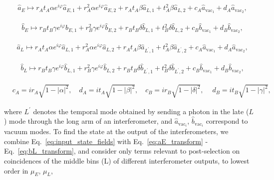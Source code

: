 \documentclass[11pt]{caltech_thesis} %
\begin{document}
\hypertarget{eq:aE_transform}{}{
\begin{align}
    &\hat{a}_{E} \mapsto r_At_A \alpha e^{i\varphi} \hat{a}_{E,1} + r_A^2 \alpha e^{i\varphi}\hat{a}_{E,2} + r_At_A\beta \hat{a}_{L,1} + t_A^2\beta \hat{a}_{L,2}+c_A\hat{a}_{\text{vac}_1}+d_A\hat{a}_{\text{vac}_2},\label{eq:aE_transform} 
\end{align}
}

\hypertarget{eq:bE_transform}{}{
\begin{align}
    &\hat{b}_{E}  \mapsto r_Bt_B \gamma e^{i\varphi} \hat{b}_{E,1} + r_B^2 \gamma e^{i\varphi}\hat{b}_{E,2} + r_Bt_B\delta \hat{b}_{L,1} + t_B^2\delta \hat{b}_{L,2}+c_B\hat{b}_{\text{vac}_1}+d_B\hat{b}_{\text{vac}_2},\label{eq:bE_transform}
\end{align}
}

\hypertarget{eq:aL_transform}{}{
\begin{align}
    &\hat{a}_{L} \mapsto  r_A t_A \alpha e^{i\varphi} \hat{a}_{L,1}  + r_A^2 \alpha e^{i\varphi}\hat{a}_{L,2} + r_A t_A\beta \hat{a}_{L^\prime,1}+ t_A^2\beta \hat{a}_{L^\prime,2}+c_A\hat{a}_{\text{vac}_1}+d_A\hat{a}_{\text{vac}_2},\label{eq:aL_transform}
\end{align}
}

\hypertarget{eq:bL_transform}{}{
\begin{align}
    &\hat{b}_{L}  \mapsto r_B t_B \gamma e^{i\varphi} \hat{b}_{L,1} + r_B^2 \gamma e^{i\varphi}\hat{b}_{L,2}  + r_B t_B\delta \hat{b}_{L^\prime,1}+ t_B^2\delta \hat{b}_{L^\prime,2}+c_B\hat{b}_{\text{vac}_1}+d_B\hat{b}_{\text{vac}_2},\label{eq:bL_transform}
\end{align}
}

\begin{align}
    &c_A =ir_A\sqrt{1-|\alpha|^2}, \quad d_A=it_A\sqrt{1-|\beta|^2},\quad
    c_B =ir_B\sqrt{1-|\delta|^2},\quad\ d_B = it_B\sqrt{1-|\gamma|^2},\nonumber
\end{align}

where $L^\prime$ denotes the temporal mode obtained by sending a photon in the late ($L$) mode through the long arm of an interferometer, and $\hat{a}_{\text{vac}_i}$, $\hat{b}_{\text{vac}_i}$ correspond to vacuum modes. To find the state at the output of the interferometers, we combine Eq.~\ref{eq:input_state_fields} with Eq.~\ref{eq:aE_transform} - Eq.~\ref{eq:bL_transform}, and consider only terms relevant to post-selection on coincidences of the middle bins (L) of different interferometer outputs, to lowest order in $\mu_E$, $\mu_L$,
\end{document}
